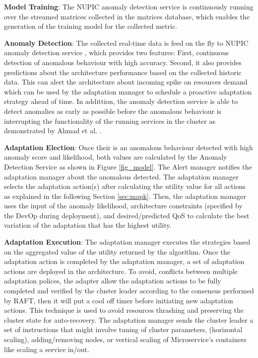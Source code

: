 \documentclass{ieeeaccess}
\begin{document}
\textbf{Model Training}: The NUPIC anomaly detection service \cite{AHMAD2017134} is continuously running over the streamed matrices collected in the matrices database, which enables the generation of the training model for the collected metric.  

\textbf{Anomaly Detection}: The collected real-time data is feed on the fly to NUPIC anomaly detection service \cite{AHMAD2017134}, which provides two features: First, continuous detection of anomalous behaviour with high accuracy. Second, it also provides predictions about the architecture performance based on the collected historic data. This can alert the architecture about incoming spike on resources demand which can be used by the adaptation manager to schedule a proactive adaptation strategy ahead of time. In addittion, the anomaly detection service is able to detect anomalies as early as possible before the anomalous behaviour is interrupting the functionality of the running services in the cluster as demonstrated by Ahmad et al. \cite{AHMAD2017134}. 

\textbf{Adaptation Election}: Once their is an anomalous behaviour detected with high anomaly score and likelihood, both values are calculated by the Anomaly Detection Service as shown in Figure \ref{fig_model}. The Alert manager notifies the adaptation manager about the anomalous detected. The adaptation manager selects the adaptation action(s) after calculating the utility value for all actions as explained in the following Section \ref{sec:mapk}. Then, the adaptation manager uses the input of the anomaly likelihood, architecture constraints (specified by the DevOp during deployment), and desired/predicted QoS to calculate the best variation of the adaptation that has the highest utility. 


\textbf{Adaptation Execution}: The adaptation manager executes the strategies based on the aggregated value of the utility returned by the algorithm. Once the adaptation action is completed by the adaptation manager, a set of adaptation actions are deployed in the architecture. To avoid, conflicts between multiple adaptation polices, the adapter allow the adaptation actions to be fully completed and verified by the cluster leader according to the consensus performed by RAFT, then it will put a cool off timer before initiating new adaptation actions. This technique is used to avoid resources thrashing and preserving the cluster state for auto-recovery. The adaptation manager sends the cluster leader a set of instructions that might involve tuning of cluster parameters, (horizontal scaling), adding/removing nodes, or vertical scaling of Microservice's containers like scaling a service in/out.  
\end{document}
